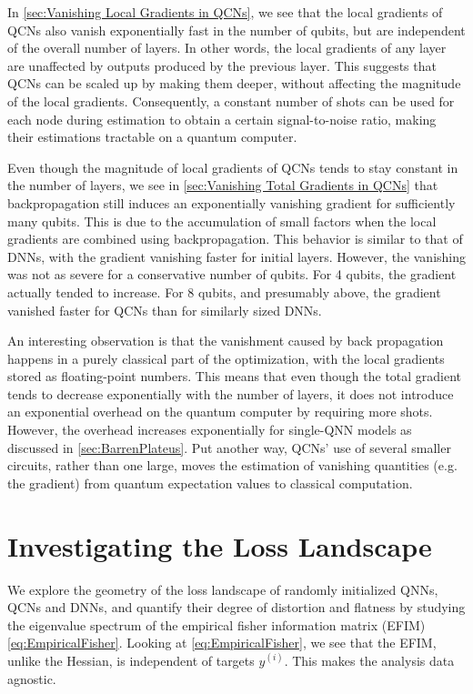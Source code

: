 In \cref{sec:Vanishing Local Gradients in QCNs}, we see that the local gradients of QCNs also vanish exponentially fast in the number of qubits, but are independent of the overall number of layers. In other words, the local gradients of any layer are unaffected by outputs produced by the previous layer. This suggests that QCNs can be scaled up by making them deeper, without affecting the magnitude of the local gradients. Consequently, a constant number of shots can be used for each node during estimation to obtain a certain signal-to-noise ratio, making their estimations tractable on a quantum computer. 

Even though the magnitude of local gradients of QCNs tends to stay constant in the number of layers, we see in \cref{sec:Vanishing Total Gradients in QCNs} that backpropagation still induces an exponentially vanishing gradient for sufficiently many qubits. This is due to the accumulation of small factors when the local gradients are combined using backpropagation. This behavior is similar to that of DNNs, with the gradient vanishing faster for initial layers. However, the vanishing was not as severe for a conservative number of qubits. For 4 qubits, the gradient actually tended to increase. For 8 qubits, and presumably above, the gradient vanished faster for QCNs than for similarly sized DNNs.  

An interesting observation is that the vanishment caused by back propagation happens in a purely classical part of the optimization, with the local gradients stored as floating-point numbers. This means that even though the total gradient tends to decrease exponentially with the number of layers, it does not introduce an exponential overhead on the quantum computer by requiring more shots. However, the overhead increases exponentially for single-QNN models as discussed in \cref{sec:BarrenPlateus}. Put another way, QCNs' use of several smaller circuits, rather than one large, moves the estimation of vanishing quantities (e.g. the gradient) from quantum expectation values to classical computation. 



\section{Investigating the Loss Landscape}\label{sec:Investigating the Loss Landscape}
We explore the geometry of the loss landscape of randomly initialized QNNs, QCNs and DNNs, and quantify their degree of distortion and flatness by studying the eigenvalue spectrum of the empirical fisher information matrix (EFIM) \cref{eq:EmpiricalFisher}. Looking at \cref{eq:EmpiricalFisher}, we see that the EFIM, unlike the Hessian, is independent of targets $y^{(i)}$. This makes the analysis data agnostic. 

